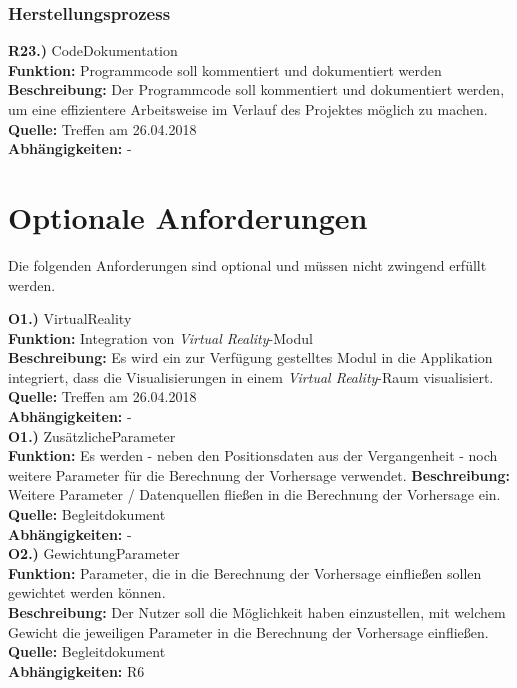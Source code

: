 \documentclass[12pt]{article} %
\begin{document}
\subsubsection{Herstellungsprozess}

\textbf{R23.)} CodeDokumentation \\
\textbf{Funktion:} Programmcode soll kommentiert und dokumentiert werden \\
\textbf{Beschreibung:} Der Programmcode soll kommentiert und dokumentiert werden, um eine effizientere Arbeitsweise im Verlauf des Projektes möglich zu machen. \\
\textbf{Quelle:} Treffen am 26.04.2018 \\
\textbf{Abhängigkeiten:} - \\

 \section{Optionale Anforderungen} \label{optionale_anforderungen}

 Die folgenden Anforderungen sind optional und müssen nicht zwingend erfüllt werden.

\textbf{O1.)} VirtualReality \\
\textbf{Funktion:} Integration von \textit{Virtual Reality}-Modul \\
\textbf{Beschreibung:} Es wird ein zur Verfügung gestelltes Modul in die Applikation integriert, dass die Visualisierungen in einem \textit{Virtual Reality}-Raum visualisiert. \\
\textbf{Quelle:} Treffen am 26.04.2018 \\
\textbf{Abhängigkeiten:} - \\

\textbf{O1.)} ZusätzlicheParameter \\
\textbf{Funktion:} Es werden - neben den Positionsdaten aus der Vergangenheit - noch weitere Parameter für die Berechnung der Vorhersage verwendet.
\textbf{Beschreibung:} Weitere Parameter / Datenquellen fließen in die Berechnung der Vorhersage ein. \\
\textbf{Quelle:} Begleitdokument \\
\textbf{Abhängigkeiten:} - \\

\textbf{O2.)} GewichtungParameter \\
\textbf{Funktion:} Parameter, die in die Berechnung der Vorhersage einfließen sollen gewichtet werden können. \\
\textbf{Beschreibung:} Der Nutzer soll die Möglichkeit haben einzustellen, mit welchem Gewicht die jeweiligen Parameter in die Berechnung der Vorhersage einfließen.\\
\textbf{Quelle:} Begleitdokument \\
\textbf{Abhängigkeiten:} R6 \\
\end{document}
